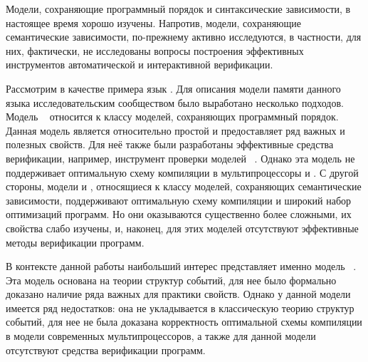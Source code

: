 Модели, сохраняющие программный порядок и синтаксические зависимости, 
в настоящее время хорошо изучены. Напротив, модели, 
сохраняющие семантические зависимости, по-прежнему активно исследуются,
в частности, для них, фактически, не исследованы
вопросы построения эффективных инструментов автоматической и интерактивной верификации. 


Рассмотрим в качестве примера язык \CPP.
Для описания модели памяти данного языка исследовательским
сообществом было выработано несколько подходов.
Модель \RCMM~\autocite{Lahav-al:PLDI17}
относится к классу моделей, сохраняющих программный порядок.
Данная модель является относительно простой и
предоставляет ряд важных и полезных свойств.
Для неё также были разработаны эффективные
средства верификации,
например, инструмент проверки моделей \genmc~\autocite{Kokologiannakis:PLDI2019}.
Однако эта модель не поддерживает
оптимальную схему компиляции в  мультипроцессоры \ARM и \POWER.
С другой стороны, модели \Prm и \Wkm,
относящиеся к классу моделей, сохраняющих семантические зависимости,
поддерживают оптимальную схему компиляции и широкий набор оптимизаций программ.
Но они оказываются существенно более сложными, их свойства слабо изучены,  и, наконец, для этих моделей
отсутствуют эффективные методы верификации программ. 

В контексте данной работы наибольший интерес
представляет именно модель \Wkm~\autocite{Chakraborty-Vafeiadis:POPL19}. 
Эта модель основана на теории структур событий,
для нее было формально доказано наличие ряда важных для практики свойств.
Однако у данной модели имеется ряд недостатков:
она не укладывается в классическую теорию структур событий,
для нее не была доказана корректность оптимальной схемы
компиляции в модели современных мультипроцессоров,
а также для данной модели отсутствуют
средства верификации программ.


